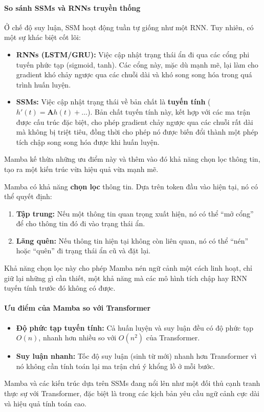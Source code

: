 \paragraph{So sánh SSMs và RNNs truyền thống}
Ở chế độ suy luận, SSM hoạt động tuần tự giống như một RNN. Tuy nhiên, có một sự khác biệt cốt lõi:
\begin{itemize}
    \item \textbf{RNNs (LSTM/GRU):} Việc cập nhật trạng thái ẩn đi qua các cổng phi tuyến phức tạp (sigmoid, tanh). Các cổng này, mặc dù mạnh mẽ, lại làm cho gradient khó chảy ngược qua các chuỗi dài và khó song song hóa trong quá trình huấn luyện.
    \item \textbf{SSMs:} Việc cập nhật trạng thái về bản chất là \textbf{tuyến tính} ($h'(t) = \mathbf{A}h(t) + \dots$). Bản chất tuyến tính này, kết hợp với các ma trận được cấu trúc đặc biệt, cho phép gradient chảy ngược qua các chuỗi rất dài mà không bị triệt tiêu, đồng thời cho phép nó được biến đổi thành một phép tích chập song song hóa được khi huấn luyện.
\end{itemize}
Mamba kế thừa những ưu điểm này và thêm vào đó khả năng chọn lọc thông tin, tạo ra một kiến trúc vừa hiệu quả vừa mạnh mẽ.
\begin{tcolorbox}[
    title=Cơ chế Chọn lọc của Mamba,
    colback=green!5!white, colframe=green!60!black, fonttitle=\bfseries
]
Mamba có khả năng \textbf{chọn lọc} thông tin. Dựa trên token đầu vào hiện tại, nó có thể quyết định:
\begin{enumerate}
    \item \textbf{Tập trung:} Nếu một thông tin quan trọng xuất hiện, nó có thể “mở cổng” để cho thông tin đó đi vào trạng thái ẩn.
    \item \textbf{Lãng quên:} Nếu thông tin hiện tại không còn liên quan, nó có thể “nén” hoặc “quên” đi trạng thái ẩn cũ và đặt lại.
\end{enumerate}
Khả năng chọn lọc này cho phép Mamba nén ngữ cảnh một cách linh hoạt, chỉ giữ lại những gì cần thiết, một khả năng mà các mô hình tích chập hay RNN tuyến tính trước đó không có được.
\end{tcolorbox}

\paragraph{Ưu điểm của Mamba so với Transformer}
\begin{itemize}
    \item \textbf{Độ phức tạp tuyến tính:} Cả huấn luyện và suy luận đều có độ phức tạp $O(n)$, nhanh hơn nhiều so với $O(n^2)$ của Transformer.
    \item \textbf{Suy luận nhanh:} Tốc độ suy luận (sinh từ mới) nhanh hơn Transformer vì nó không cần tính toán lại ma trận chú ý khổng lồ ở mỗi bước.
\end{itemize}
Mamba và các kiến trúc dựa trên SSMs đang nổi lên như một đối thủ cạnh tranh thực sự với Transformer, đặc biệt là trong các kịch bản yêu cầu ngữ cảnh cực dài và hiệu quả tính toán cao.

